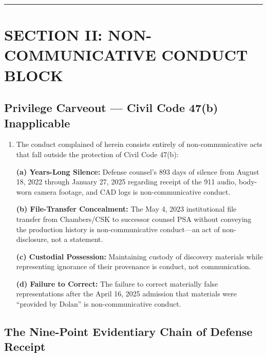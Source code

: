 \begin{center}\rule{0.5\linewidth}{0.5pt}\end{center}

\label{toc:section-ii-noncommunicative-conduct-block}
\section{SECTION II: NON-COMMUNICATIVE CONDUCT BLOCK}\label{section-ii-non-communicative-conduct-block}

\subsection{Privilege Carveout --- Civil Code \textsection{} 47(b) Inapplicable}\label{privilege-carveout-civil-code-47b-inapplicable}

\begin{enumerate}
\def\labelenumi{\arabic{enumi}.}
\setcounter{enumi}{7}
\item
  The conduct complained of herein consists entirely of non-communicative acts that fall outside the protection of Civil Code \textsection{} 47(b):

  \textbf{(a) Years-Long Silence:} Defense counsel's 893 days of silence from August 18, 2022 through January 27, 2025 regarding receipt of the 911 audio, body-worn camera footage, and CAD logs is non-communicative conduct.

  \textbf{(b) File-Transfer Concealment:} The May 4, 2023 institutional file transfer from Chambers/CSK to successor counsel PSA without conveying the production history is non-communicative conduct---an act of non-disclosure, not a statement.

  \textbf{(c) Custodial Possession:} Maintaining custody of discovery materials while representing ignorance of their provenance is conduct, not communication.

  \textbf{(d) Failure to Correct:} The failure to correct materially false representations after the April 16, 2025 admission that materials were ``provided by Dolan'' is non-communicative conduct.
\end{enumerate}

\subsection{The Nine-Point Evidentiary Chain of Defense Receipt}\label{the-nine-point-evidentiary-chain-of-defense-receipt}


